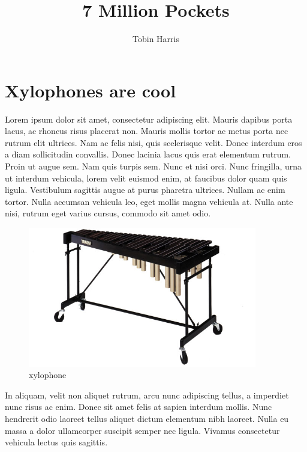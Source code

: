 \documentclass[11pt,oneside,openany]{book}
\begin{document}
\frontmatter
\title{7 Million Pockets}
\author{Tobin Harris}
\maketitle
\tableofcontents

\mainmatter
\chapter{Xylophones are cool}\hypertarget{xylophones-are-cool}{}\label{xylophones-are-cool}

Lorem ipsum dolor sit amet, consectetur adipiscing elit. Mauris dapibus porta lacus, ac rhoncus risus placerat non. Mauris mollis tortor ac metus porta nec rutrum elit ultrices. Nam ac felis nisi, quis scelerisque velit. Donec interdum eros a diam sollicitudin convallis. Donec lacinia lacus quis erat elementum rutrum. Proin ut augue sem. Nam quis turpis sem. Nunc et nisi orci. Nunc fringilla, urna ut interdum vehicula, lorem velit euismod enim, at faucibus dolor quam quis ligula. Vestibulum sagittis augue at purus pharetra ultrices. Nullam ac enim tortor. Nulla accumsan vehicula leo, eget mollis magna vehicula at. Nulla ante nisi, rutrum eget varius cursus, commodo sit amet odio.

\begin{figure}[htb]
\begin{center}
\includegraphics[width=100mm]{./_media/xylophone1.jpg}
\end{center}
\caption{xylophone}

\end{figure}

In aliquam, velit non aliquet rutrum, arcu nunc adipiscing tellus, a imperdiet nunc risus ac enim. Donec sit amet felis at sapien interdum mollis. Nunc hendrerit odio laoreet tellus aliquet dictum elementum nibh laoreet. Nulla eu massa a dolor ullamcorper suscipit semper nec ligula. Vivamus consectetur vehicula lectus quis sagittis.
\end{document}
